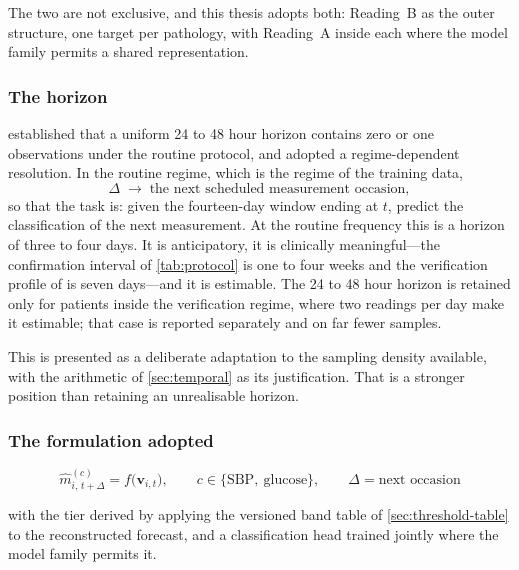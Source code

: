 \documentclass[12pt,a4paper,oneside]{report}
\begin{document}
The two are not exclusive, and this thesis adopts both: Reading~B as the outer structure, one target per pathology, with Reading~A inside each where the model family permits a shared representation.

\subsubsection{The horizon}\label{sec:horizon-adopted}

 established that a uniform 24 to 48 hour horizon contains zero or one observations under the routine protocol, and adopted a regime-dependent resolution. In the routine regime, which is the regime of the training data,
\begin{equation}
  \Delta \;\longrightarrow\; \text{the next scheduled measurement occasion},
\end{equation}
so that the task is: given the fourteen-day window ending at $t$, predict the classification of the next measurement. At the routine frequency this is a horizon of three to four days. It is anticipatory, it is clinically meaningful---the confirmation interval of \cref{tab:protocol} is one to four weeks and the verification profile of \textcite{mihevc2025} is seven days---and it is estimable. The 24 to 48 hour horizon is retained only for patients inside the verification regime, where two readings per day make it estimable; that case is reported separately and on far fewer samples.

This is presented as a deliberate adaptation to the sampling density available, with the arithmetic of \cref{sec:temporal} as its justification. That is a stronger position than retaining an unrealisable horizon.

\subsubsection{The formulation adopted}

\begin{equation}
  \boxed{\;\hat{m}^{(c)}_{i,\,t+\Delta} = f\bigl(\mathbf{v}_{i,t}\bigr),
  \qquad c \in \{\mathrm{SBP},\ \text{glucose}\},
  \qquad \Delta = \text{next occasion}\;}
\end{equation}

with the tier derived by applying the versioned band table of \cref{sec:threshold-table} to the reconstructed forecast, and a classification head trained jointly where the model family permits it.
\end{document}
